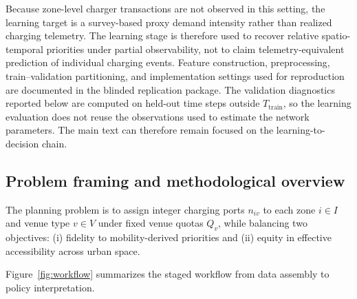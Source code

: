 \documentclass[final,5p,times,twocolumn,authoryear]{elsarticle}
\begin{document}
Because zone-level charger transactions are not observed in this setting, the learning target
is a survey-based proxy demand intensity rather than realized charging telemetry. The
learning stage is therefore used to recover relative spatio-temporal priorities under partial
observability, not to claim telemetry-equivalent prediction of individual charging events.
Feature construction, preprocessing, train--validation partitioning, and implementation
settings used for reproduction are documented in the blinded replication package. The
validation diagnostics reported below are computed on held-out time steps outside
$T_{\mathrm{train}}$, so the learning evaluation does not reuse the observations used to
estimate the network parameters. The main text can therefore remain focused on the
learning-to-decision chain.

\subsection{Problem framing and methodological overview}

The planning problem is to assign integer charging ports $n_{iv}$ to each zone $i \in I$ and
venue type $v \in V$ under fixed venue quotas $Q_v$, while balancing two objectives: (i)
fidelity to mobility-derived priorities and (ii) equity in effective accessibility across
urban space.

Figure~\ref{fig:workflow} summarizes the staged workflow from data assembly to policy
interpretation.
\end{document}
